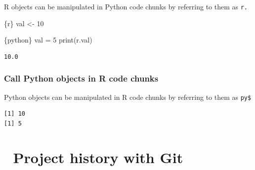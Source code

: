 \documentclass[
  letterpaper,
  DIV=11,
  numbers=noendperiod]{scrreprt}
\newenvironment{Shaded}{\begin{snugshade}}{\end{snugshade}}
\newcommand{\BuiltInTok}[1]{\textcolor[rgb]{0.00,0.23,0.31}{#1}}
\newcommand{\DecValTok}[1]{\textcolor[rgb]{0.68,0.00,0.00}{#1}}
\newcommand{\FunctionTok}[1]{\textcolor[rgb]{0.28,0.35,0.67}{#1}}
\newcommand{\InformationTok}[1]{\textcolor[rgb]{0.37,0.37,0.37}{#1}}
\newcommand{\NormalTok}[1]{\textcolor[rgb]{0.00,0.23,0.31}{#1}}
\newcommand{\OperatorTok}[1]{\textcolor[rgb]{0.37,0.37,0.37}{#1}}
\newcommand{\OtherTok}[1]{\textcolor[rgb]{0.00,0.23,0.31}{#1}}
\newcommand{\SpecialCharTok}[1]{\textcolor[rgb]{0.37,0.37,0.37}{#1}}
\begin{document}
R objects can be manipulated in Python code chunks by referring to them
as \texttt{r.}

\begin{Shaded}
\begin{Highlighting}[]
\InformationTok{\textasciigrave{}\textasciigrave{}\textasciigrave{}\{r\}}
\NormalTok{val }\OtherTok{\textless{}{-}} \DecValTok{10}
\InformationTok{\textasciigrave{}\textasciigrave{}\textasciigrave{}}
\end{Highlighting}
\end{Shaded}

\begin{Shaded}
\begin{Highlighting}[]
\InformationTok{\textasciigrave{}\textasciigrave{}\textasciigrave{}\{python\}}
\NormalTok{val }\OperatorTok{=} \DecValTok{5}
\BuiltInTok{print}\NormalTok{(r.val)}
\InformationTok{\textasciigrave{}\textasciigrave{}\textasciigrave{}}
\end{Highlighting}
\end{Shaded}

\begin{verbatim}
10.0
\end{verbatim}

\hypertarget{call-python-objects-in-r-code-chunks}{%
\subsection{Call Python objects in R code
chunks}\label{call-python-objects-in-r-code-chunks}}

Python objects can be manipulated in R code chunks by referring to them
as \texttt{py\$}

\begin{Shaded}
\end{Shaded}

\begin{verbatim}
[1] 10
[1] 5
\end{verbatim}

\hypertarget{project-history-with-git}{%
\chapter{\texorpdfstring{{📘} Project history with
Git}{📘 Project history with Git}}\label{project-history-with-git}}
\end{document}

